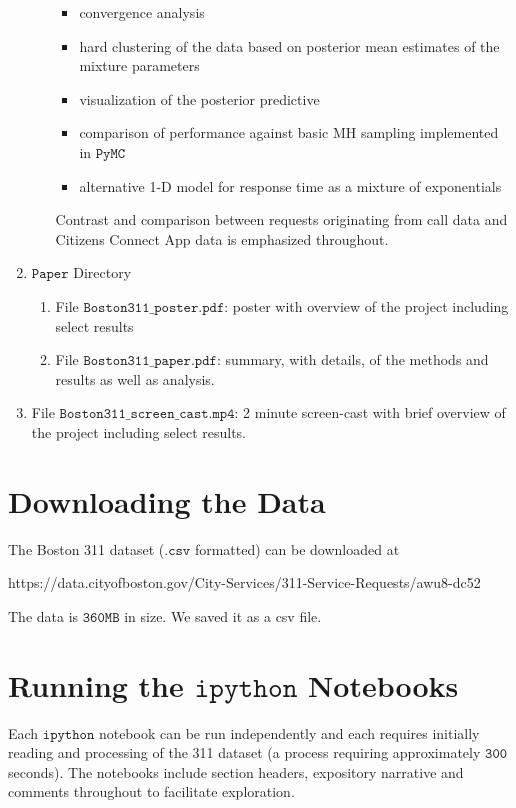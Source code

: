 \documentclass{article}
\theoremstyle{theorem}
\theoremstyle{theorem}
\theoremstyle{theorem}
\theoremstyle{lemma}
\theoremstyle{definition}
\theoremstyle{example}
\begin{document}
\begin{enumerate}
\begin{enumerate}
\begin{itemize}
\item convergence analysis
\item hard clustering of the data based on posterior mean estimates of the mixture parameters
\item visualization of the posterior predictive 
\item comparison of performance against basic MH sampling implemented in $\texttt{PyMC}$
\item alternative 1-D model for response time as a mixture of exponentials
\end{itemize}
Contrast and comparison between requests originating from call data and Citizens Connect App data is emphasized throughout.
\end{enumerate}
\item $\texttt{Paper}$ Directory
\begin{enumerate}
\item File $\texttt{Boston311\_poster.pdf}$: poster with overview of the project including select results
\item File $\texttt{Boston311\_paper.pdf}$: summary, with details, of the methods and results as well as analysis. 
\end{enumerate}
\item File $\texttt{Boston311\_screen\_cast.mp4}$: 2 minute screen-cast with brief overview of the project including select results.
\end{enumerate}

\section{Downloading the Data}
The Boston 311 dataset ($\texttt{.csv}$ formatted) can be downloaded at
\begin{center}
https://data.cityofboston.gov/City-Services/311-Service-Requests/awu8-dc52
\end{center}
The data is $\mathtt{360MB}$ in size. We saved it as a csv file. 
\section{Running the $\texttt{ipython}$ Notebooks}
Each $\texttt{ipython}$ notebook can be run independently and each requires initially reading and processing of the 311 dataset (a process requiring approximately $\mathtt{300}$ seconds). The notebooks include section headers, expository narrative and comments throughout to facilitate exploration. 
\end{document}
